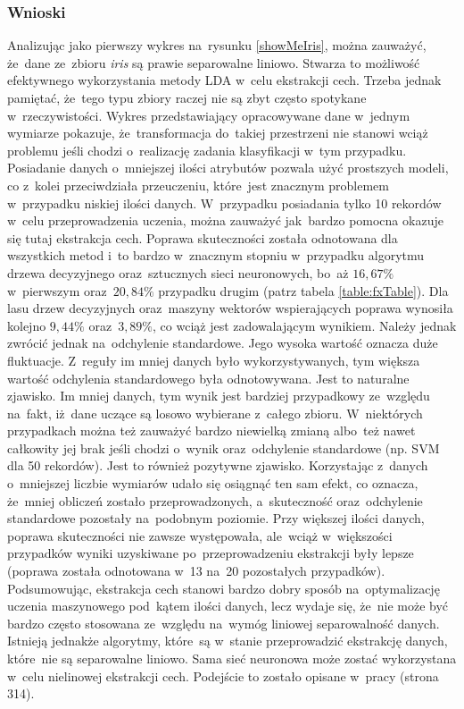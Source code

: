 \subsubsection{Wnioski}
Analizując jako pierwszy wykres na~rysunku \ref{showMeIris}, można zauważyć, że~dane ze~zbioru \textit{iris} są prawie separowalne liniowo. Stwarza to możliwość efektywnego wykorzystania metody LDA w~celu ekstrakcji cech. Trzeba jednak pamiętać, że~tego typu zbiory raczej nie są zbyt często spotykane w~rzeczywistości. Wykres przedstawiający opracowywane dane w~jednym wymiarze pokazuje, że~transformacja do~takiej przestrzeni nie stanowi wciąż problemu jeśli chodzi o~realizację zadania klasyfikacji w~tym przypadku. Posiadanie danych o~mniejszej ilości atrybutów pozwala użyć prostszych modeli, co z~kolei przeciwdziała przeuczeniu, które~jest znacznym problemem w~przypadku niskiej ilości danych. W~przypadku posiadania tylko 10 rekordów w~celu przeprowadzenia uczenia, można zauważyć jak~bardzo pomocna okazuje się tutaj ekstrakcja cech. Poprawa skuteczności została odnotowana dla wszystkich metod i~to bardzo w~znacznym stopniu w~przypadku algorytmu drzewa decyzyjnego oraz~sztucznych sieci neuronowych, bo~aż $16,67 \%$ w~pierwszym oraz~$20,84 \%$ przypadku drugim (patrz tabela \ref{table:fxTable}). Dla lasu drzew decyzyjnych oraz~maszyny wektorów wspierających poprawa wynosiła kolejno $9,44 \%$ oraz~$3,89 \%$, co wciąż jest zadowalającym wynikiem.  Należy jednak zwrócić jednak na~odchylenie standardowe. Jego wysoka wartość oznacza duże fluktuacje. Z~reguły im mniej danych było wykorzystywanych, tym większa wartość odchylenia standardowego była odnotowywana. Jest to naturalne zjawisko. Im mniej danych, tym wynik jest bardziej przypadkowy ze~względu na~fakt, iż~dane uczące są losowo wybierane z~całego zbioru. W~niektórych przypadkach można też zauważyć bardzo niewielką zmianą albo~też nawet całkowity jej brak jeśli chodzi o~wynik oraz~odchylenie standardowe (np. SVM dla 50 rekordów). Jest to również pozytywne zjawisko. Korzystając z~danych o~mniejszej liczbie wymiarów udało się osiągnąć ten sam efekt, co oznacza, że~mniej obliczeń zostało przeprowadzonych, a~skuteczność oraz~odchylenie standardowe pozostały na~podobnym poziomie. Przy większej ilości danych, poprawa skuteczności nie zawsze występowała, ale~wciąż w~większości przypadków wyniki uzyskiwane po~przeprowadzeniu ekstrakcji były lepsze (poprawa została odnotowana w~13 na~20 pozostałych przypadków). Podsumowując, ekstrakcja cech stanowi bardzo dobry sposób na~optymalizację uczenia maszynowego pod~kątem ilości danych, lecz wydaje się, że~nie może być bardzo często stosowana ze~względu na~wymóg liniowej separowalność danych. Istnieją jednakże algorytmy, które~są w~stanie przeprowadzić ekstrakcję danych, które~nie są separowalne liniowo. Sama sieć neuronowa może zostać wykorzystana w~celu nielinowej ekstrakcji cech.  Podejście to zostało opisane w~pracy \cite{bishop1995neural} (strona 314).


